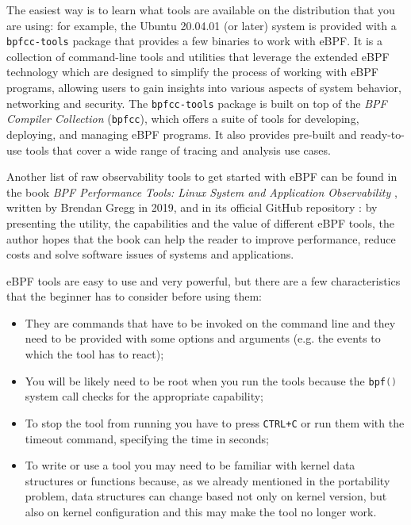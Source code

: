 The easiest way is to learn what tools are available on the distribution that you are using: for example, the Ubuntu 20.04.01 (or later) system is provided with a \colorbox{backcolour}{\lstinline[style=highlight, language=bash]|bpfcc-tools|} package that provides a few binaries to work with eBPF.
It is a collection of command-line tools and utilities that leverage the extended eBPF technology which are designed to simplify the process of working with eBPF programs, allowing users to gain insights into various aspects of system behavior, networking and security.
The \colorbox{backcolour}{\lstinline[style=highlight, language=bash]|bpfcc-tools|} package is built on top of the \textit{BPF Compiler Collection} (\colorbox{backcolour}{\lstinline[style=highlight, language=bash]|bpfcc|}), which offers a suite of tools for developing, deploying, and managing eBPF programs. 
It also provides pre-built and ready-to-use tools that cover a wide range of tracing and analysis use cases. 

Another list of raw observability tools to get started with eBPF can be found in the book \textit{BPF Performance Tools: Linux System and Application Observability} \cite{BPFToolsBookWebsite}, written by Brendan Gregg in 2019, and in its official GitHub repository \cite{BPFToolsBookGitHubRepo}: by presenting the utility, the capabilities and the value of different eBPF tools, the author hopes that the book can help the reader to improve performance, reduce costs and solve software issues of systems and applications.

eBPF tools are easy to use and very powerful, but there are a few characteristics that the beginner has to consider before using them:

\begin{itemize}
	\item 
		They are commands that have to be invoked on the command line and they need to be provided with some options and arguments (e.g. the events to which the tool has to react);
	\item 
		You will be likely need to be root when you run the tools because the \colorbox{backcolour}{\lstinline[style=cstyle, language=C]|bpf()|} system call checks for the appropriate capability;
	\item 
		To stop the tool from running you have to press \colorbox{backcolour}{\lstinline[style=highlight, language=bash]|CTRL+C|} or run them with the timeout command, specifying the time in seconds;
	\item 
		To write or use a tool you may need to be familiar with kernel data structures or functions because, as we already mentioned in the portability problem, data structures can change based not only on kernel version, but also on kernel configuration and this may make the tool no longer work.
\end{itemize}

